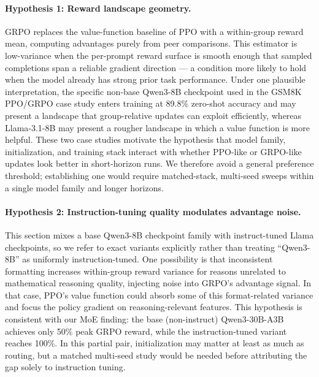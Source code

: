 \documentclass{article}
\begin{document}
\paragraph{Hypothesis 1: Reward landscape geometry.}
GRPO replaces the value-function baseline of PPO with a within-group reward
mean, computing advantages purely from peer comparisons.
This estimator is low-variance when the per-prompt reward surface is smooth
enough that sampled completions span a reliable gradient direction --- a
condition more likely to hold when the model already has strong prior task
performance.
Under one plausible interpretation, the specific non-base Qwen3-8B checkpoint
used in the GSM8K PPO/GRPO case study enters training at 89.8\% zero-shot
accuracy and may present a landscape that group-relative updates can exploit
efficiently, whereas Llama-3.1-8B may present a rougher landscape in which a
value function is more helpful.
These two case studies motivate the hypothesis that model family,
initialization, and training stack interact with whether PPO-like or GRPO-like
updates look better in short-horizon runs. We therefore avoid a general
preference threshold; establishing one would require matched-stack, multi-seed
sweeps within a single model family and longer horizons.

\paragraph{Hypothesis 2: Instruction-tuning quality modulates advantage noise.}
This section mixes a base Qwen3-8B checkpoint family with instruct-tuned Llama
checkpoints, so we refer to exact variants explicitly rather than treating
``Qwen3-8B'' as uniformly instruction-tuned.
One possibility is that inconsistent formatting increases within-group reward
variance for reasons unrelated to mathematical reasoning quality, injecting
noise into GRPO's advantage signal. In that case, PPO's value function could
absorb some of this format-related variance and focus the policy gradient on
reasoning-relevant features.
This hypothesis is consistent with our MoE finding: the base (non-instruct)
Qwen3-30B-A3B achieves only 50\% peak GRPO reward, while the instruction-tuned
variant reaches 100\%. In this partial pair, initialization may matter at
least as much as routing, but a matched multi-seed study would be needed
before attributing the gap solely to instruction tuning.
\end{document}
